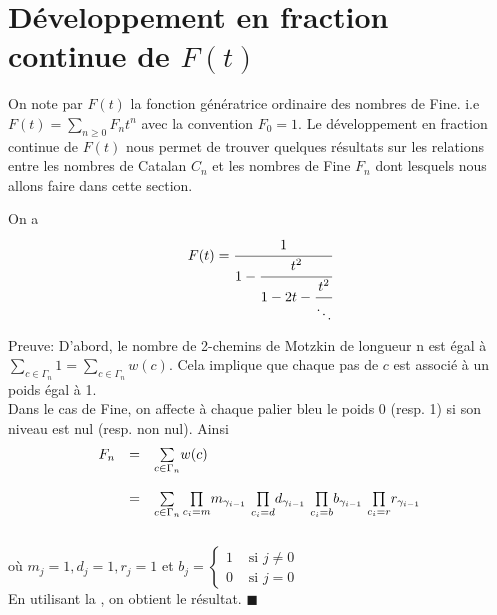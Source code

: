 \section{Développement en fraction continue de $F(t)$}
On note par $F(t)$ la fonction génératrice ordinaire des nombres de Fine.
i.e $F(t) = \underset{n \geq 0}{\sum}F_{n}t^{n}$ avec la convention $F_{0}=1$. Le développement en fraction continue de $F(t)$ nous permet de trouver quelques résultats sur les relations entre les nombres de Catalan $C_{n}$ et les nombres de Fine $F_{n}$ dont lesquels nous allons faire dans cette section.\vspace{10pt}
\begin{proposition} \label{Fn-frac}
	On a $$F(t) = \cfrac{1}{1 - \cfrac{t^2}{1 - 2t - \cfrac{t^2}{\ddots}}}$$\vspace{5pt}
\end{proposition}
Preuve:
D'abord, le nombre de 2-chemins de Motzkin de longueur n est égal à $\underset{c \in \Gamma_{n}}{\sum}1 = \sum\limits_{c\in \Gamma_{n}}w(c)$. Cela implique que chaque pas de $c$ est associé à un poids égal à 1.\\
Dans le cas de Fine, on affecte à chaque palier bleu le poids 0 (resp. 1) si son niveau est nul (resp. non
nul).
Ainsi
\[
	\begin{array} {l l l}
		F_{n} & =       & \underset{c \in \Gamma_{n}}{\sum}w(c)                                                                    \\
		      & \text{} &                                                                                                          \\
		      & =       & \sum\limits_{c\in \Gamma_{n}}\underset{c_{i}=m}{\prod}m_{\gamma_{i-1}}\text{ } \underset{c_{i}=d}{\prod}
		d_{\gamma_{i-1}}\text{ }\underset{c_{i}=b}{\prod}b_{\gamma_{i-1}}\text{ }\underset{c_{i}=r}
		{\prod}r_{\gamma_{i-1}}                                                                                                    \\
	\end{array}
\]
\text{}\vspace{10pt}\\
où $m_{j}=1, d_{j}=1, r_{j}=1$ et $b_{j} = \begin{cases}
		1 & \text{ si } j\neq 0 \\
		0 & \text{ si } j=0
	\end{cases}$\\
En utilisant la , on obtient le résultat. \hspace{10pt}$\blacksquare$
